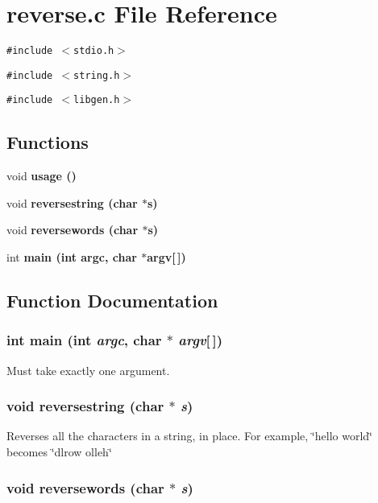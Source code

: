 \section{reverse.c File Reference}
\label{reverse_8c}
{\tt \#include $<$stdio.h$>$}\par
{\tt \#include $<$string.h$>$}\par
{\tt \#include $<$libgen.h$>$}\par
\subsection*{Functions}
\begin{CompactItemize}
\item 
void \bf{usage} ()
\item 
void \bf{reversestring} (char $\ast$s)
\item 
void \bf{reversewords} (char $\ast$s)
\item 
int \bf{main} (int argc, char $\ast$argv[$\,$])
\end{CompactItemize}


\subsection{Function Documentation}
\subsubsection{\setlength{\rightskip}{0pt plus 5cm}int main (int {\em argc}, char $\ast$ {\em argv}[$\,$])}\label{reverse_8c_0ddf1224851353fc92bfbff6f499fa97}


Must take exactly one argument. 
\subsubsection{\setlength{\rightskip}{0pt plus 5cm}void reversestring (char $\ast$ {\em s})}\label{reverse_8c_2de0716c6c6b72b57cfed26ba7f70d00}


Reverses all the characters in a string, in place. For example, \char`\"{}hello world\char`\"{} becomes \char`\"{}dlrow olleh\char`\"{} 
\subsubsection{\setlength{\rightskip}{0pt plus 5cm}void reversewords (char $\ast$ {\em s})}\label{reverse_8c_6e2fcdfc3580273d08a189d32f435ce9}


